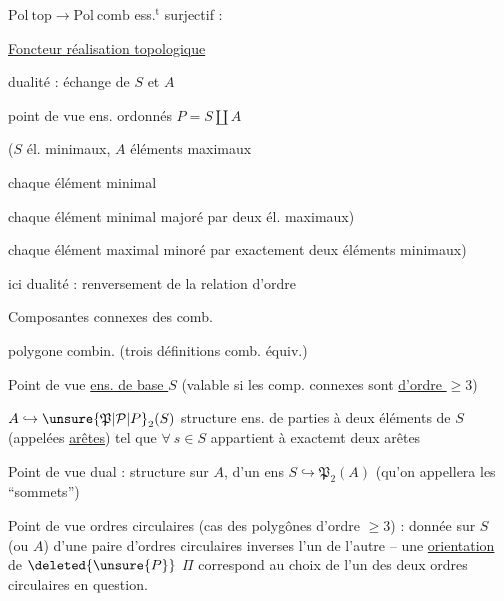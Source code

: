 $\mathrm{Pol}\ \mathrm{top}\longrightarrow\mathrm{Pol}\ \mathrm{comb}$ ess.$^{\mathrm t}$ surjectif : 

\uline{Foncteur réalisation topologique}

dualité : échange de $S$ et $A$


point de vue ens. ordonnés \quad $P=S\amalg A$

 ($S$ él. minimaux, $A$ éléments maximaux

chaque élément minimal 

chaque élément minimal majoré  par  deux él.  maximaux)

chaque élément maximal minoré par exactement deux éléments  minimaux)

ici dualité : renversement de la relation d'ordre

Composantes connexes   des  comb.

 polygone combin. (trois définitions comb. équiv.)

Point de vue \uline{ens. de base $S$} (valable si les comp. connexes sont \uline{d'ordre $\geq3$})

$A\hookrightarrow\unsure{\mathfrak P|\mathcal P|P}_2(S)$ structure ens. de parties à deux éléments de $S$ (appelées \uline{arêtes}) tel que $\forall\ s\in S$ appartient à exactemt deux arêtes

Point de vue dual : structure sur $A$, d'un ens $S\hookrightarrow\mathfrak P_2(A)$ (qu'on appellera les ``sommets'')

Point de vue ordres circulaires (cas des polygônes d'ordre $\geq3$) : donnée sur $S$ (ou $A$) d'une paire d'ordres circulaires  inverses l'un de l'autre -- une \uline{orientation} de $\deleted{\unsure{P}}$ $\Pi$ correspond au choix de l'un des deux ordres circulaires en question.
